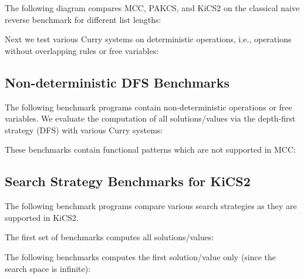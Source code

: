 \documentclass{article}
\begin{document}
The following diagram compares MCC, PAKCS, and KiCS2
on the classical naive reverse benchmark for different list lengths:

\begin{center}
\end{center}

Next we test various Curry systems on deterministic operations,
i.e., operations without overlapping rules or free variables:

\begin{center}
\end{center}


\subsection{Non-deterministic DFS Benchmarks}

The following benchmark programs contain non-deterministic operations
or free variables. We evaluate the computation of all
solutions/values via the depth-first strategy (DFS)
with various Curry systems:

\begin{center}
\end{center}

These benchmarks contain functional patterns which are not supported in MCC:

\begin{center}
\end{center}


\subsection{Search Strategy Benchmarks for KiCS2}

The following benchmark programs compare various search strategies
as they are supported in KiCS2.

The first set of benchmarks computes all solutions/values:

\begin{center}
\end{center}

The following benchmarks computes the first solution/value
only (since the search space is infinite):

\begin{center}
\end{center}
\end{document}
